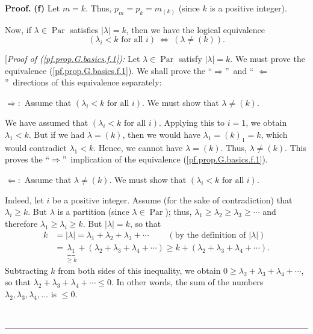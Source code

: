 \documentclass[numbers=enddot,12pt,final,onecolumn,notitlepage]{scrartcl}%
\theoremstyle{definition}
\newenvironment{proof}[1][Proof]{\noindent\textbf{#1.} }{\ \rule{0.5em}{0.5em}}
\newenvironment{verlong}{}{}
\begin{document}
\begin{verlong}
\begin{proof}
\textbf{(f)} Let $m=k$. Thus, $p_{m}=p_{k}=m_{\left(  k\right)  }$ (since $k$
is a positive integer).

Now, if $\lambda\in\operatorname*{Par}$ satisfies $\left\vert \lambda
\right\vert =k$, then we have the logical equivalence%
\begin{equation}
\left(  \lambda_{i}<k\text{ for all }i\right)  \ \Longleftrightarrow\ \left(
\lambda\neq\left(  k\right)  \right)  . \label{pf.prop.G.basics.f.1}%
\end{equation}


[\textit{Proof of (\ref{pf.prop.G.basics.f.1}):} Let $\lambda\in
\operatorname*{Par}$ satisfy $\left\vert \lambda\right\vert =k$. We must prove
the equivalence (\ref{pf.prop.G.basics.f.1}). We shall prove the
\textquotedblleft$\Longrightarrow$\textquotedblright\ and \textquotedblleft%
$\Longleftarrow$\textquotedblright\ directions of this equivalence separately:

$\Longrightarrow:$ Assume that $\left(  \lambda_{i}<k\text{ for all }i\right)
$. We must show that $\lambda\neq\left(  k\right)  $.

We have assumed that $\left(  \lambda_{i}<k\text{ for all }i\right)  $.
Applying this to $i=1$, we obtain $\lambda_{1}<k$. But if we had
$\lambda=\left(  k\right)  $, then we would have $\lambda_{1}=\left(
k\right)  _{1}=k$, which would contradict $\lambda_{1}<k$. Hence, we cannot
have $\lambda=\left(  k\right)  $. Thus, $\lambda\neq\left(  k\right)  $. This
proves the \textquotedblleft$\Longrightarrow$\textquotedblright\ implication
of the equivalence (\ref{pf.prop.G.basics.f.1}).

$\Longleftarrow:$ Assume that $\lambda\neq\left(  k\right)  $. We must show
that $\left(  \lambda_{i}<k\text{ for all }i\right)  $.

Indeed, let $i$ be a positive integer. Assume (for the sake of contradiction)
that $\lambda_{i}\geq k$. But $\lambda$ is a partition (since $\lambda
\in\operatorname*{Par}$); thus, $\lambda_{1}\geq\lambda_{2}\geq\lambda_{3}%
\geq\cdots$ and therefore $\lambda_{1}\geq\lambda_{i}\geq k$. But $\left\vert
\lambda\right\vert =k$, so that
\begin{align*}
k  &  =\left\vert \lambda\right\vert =\lambda_{1}+\lambda_{2}+\lambda
_{3}+\cdots\ \ \ \ \ \ \ \ \ \ \left(  \text{by the definition of }\left\vert
\lambda\right\vert \right) \\
&  =\underbrace{\lambda_{1}}_{\geq k}+\left(  \lambda_{2}+\lambda_{3}%
+\lambda_{4}+\cdots\right)  \geq k+\left(  \lambda_{2}+\lambda_{3}+\lambda
_{4}+\cdots\right)  .
\end{align*}
Subtracting $k$ from both sides of this inequality, we obtain $0\geq
\lambda_{2}+\lambda_{3}+\lambda_{4}+\cdots$, so that $\lambda_{2}+\lambda
_{3}+\lambda_{4}+\cdots\leq0$. In other words, the sum of the numbers
$\lambda_{2},\lambda_{3},\lambda_{4},\ldots$ is $\leq0$.


\end{proof}
\end{verlong}
\end{document}
